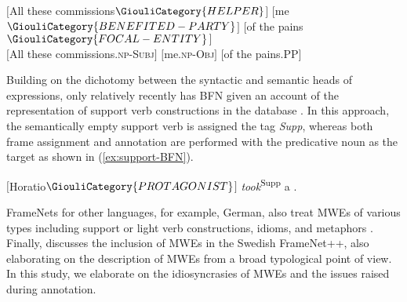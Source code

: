 \documentclass[output=paper,colorlinks,citecolor=brown]{langscibook}
\begin{document}
\ea
\label{ex:help-out}

 $[$All these commissions$\GiouliCategory{HELPER}$$]$  $[$me$\GiouliCategory{BENEFITED-PARTY}$$]$  $[$of the pains$\GiouliCategory{FOCAL-ENTITY}$$]$  \\

 $[$All these commissions.\textsc{np-Subj}$]$  $[$me.\textsc{np-Obj}$]$  $[$of the pains.\textsc{PP}$]$  \\
 \z

Building on the dichotomy between the syntactic and semantic heads of expressions, only relatively recently has BFN given an account of the representation of support verb constructions in the database \citep{petruck-ellsworth-2016-representing}. In this approach, the semantically empty support verb is assigned the tag \textit{Supp}, whereas both frame assignment and annotation are performed with the predicative noun as the target as shown in (\ref{ex:support-BFN}).

\ea
\label{ex:support-BFN}
$[$Horatio$\GiouliCategory{PROTAGONIST}$$]$ \textit{took}\textsuperscript{Supp} a . \citep{petruck-ellsworth-2016-representing}
\z

FrameNets for other languages, for example, German, also treat MWEs of various types including support or light verb constructions, idioms, and metaphors \citep{BurchardtPinkal2009}. Finally, \citet{Borin-Lars2021-311388} discusses the inclusion of MWEs in the Swedish FrameNet++, also elaborating on the description of MWEs from a broad typological point of view. In this study, we elaborate on the idiosyncrasies of MWEs and the issues raised during annotation.
\end{document}
